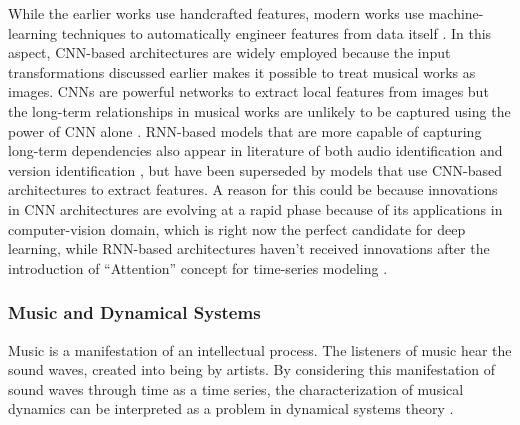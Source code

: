 \documentclass[../main.tex]{subfiles}
\begin{document}
\par
While the earlier works use handcrafted features, modern works use machine-learning techniques to automatically engineer features from data itself \cite{arcas_now_2017,yuTemporalPyramidPooling2019,baez_suarez_unsupervised_2020,yu_contrastive_2020,dorasCoverDetectionUsing2019,jiang_yang_chen_2020,yesilerAccurateScalableVersion2020,yesilerLessMoreFaster2020,yeSupervisedDeepHashing2019b,yuTemporalPyramidPooling2019}. In this aspect, \gls{CNN}-based architectures are widely employed because the input transformations discussed earlier makes it possible to treat musical works as images. \gls{CNN}s are powerful networks to extract local features from images but the long-term relationships in musical works are unlikely to be captured using the power of \gls{CNN} alone \cite{yesilerAccurateScalableVersion2020}. \gls{RNN}-based models that are more capable of capturing long-term dependencies also appear in literature of both audio identification \cite{baez_suarez_unsupervised_2020} and version identification \cite{yeSupervisedDeepHashing2019b}, but have been superseded by models that use \gls{CNN}-based architectures to extract features. A reason for this could be because innovations in \gls{CNN} architectures are evolving at a rapid phase because of its applications in computer-vision domain, which is right now the perfect candidate for deep learning, while \gls{RNN}-based architectures haven't received innovations after the introduction of “Attention” concept for time-series modeling \cite{vaswaniAttentionAllYou2017}.

\subsubsection{Music and Dynamical Systems}

\par
Music is a manifestation of an intellectual process. The listeners of music hear the sound waves, created into being by artists. By considering this manifestation of sound waves through time as a time series, the characterization of musical dynamics can be interpreted as a problem in dynamical systems theory \cite{complex_dynamics}. 
\end{document}
